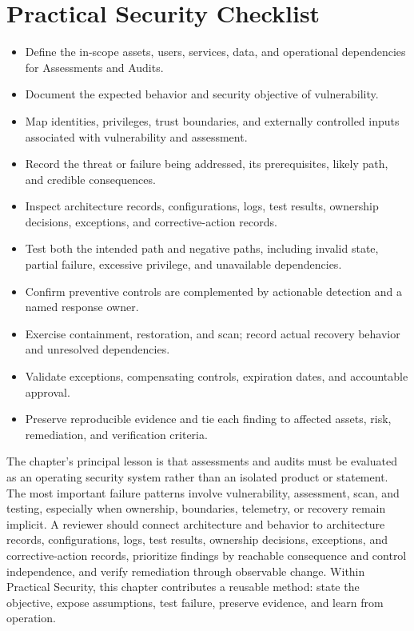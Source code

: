 \documentclass[11pt]{article}
\begin{document}
\section*{Practical Security Checklist}
\begin{itemize}[label=$\square$]
\item Define the in-scope assets, users, services, data, and operational dependencies for Assessments and Audits.
\item Document the expected behavior and security objective of vulnerability.
\item Map identities, privileges, trust boundaries, and externally controlled inputs associated with vulnerability and assessment.
\item Record the threat or failure being addressed, its prerequisites, likely path, and credible consequences.
\item Inspect architecture records, configurations, logs, test results, ownership decisions, exceptions, and corrective-action records.
\item Test both the intended path and negative paths, including invalid state, partial failure, excessive privilege, and unavailable dependencies.
\item Confirm preventive controls are complemented by actionable detection and a named response owner.
\item Exercise containment, restoration, and scan; record actual recovery behavior and unresolved dependencies.
\item Validate exceptions, compensating controls, expiration dates, and accountable approval.
\item Preserve reproducible evidence and tie each finding to affected assets, risk, remediation, and verification criteria.
\end{itemize}
\begin{synthesisbox}
The chapter's principal lesson is that assessments and audits must be evaluated as an operating security system rather than an isolated product or statement. The most important failure patterns involve vulnerability, assessment, scan, and testing, especially when ownership, boundaries, telemetry, or recovery remain implicit. A reviewer should connect architecture and behavior to architecture records, configurations, logs, test results, ownership decisions, exceptions, and corrective-action records, prioritize findings by reachable consequence and control independence, and verify remediation through observable change. Within Practical Security, this chapter contributes a reusable method: state the objective, expose assumptions, test failure, preserve evidence, and learn from operation.
\end{synthesisbox}
\end{document}
